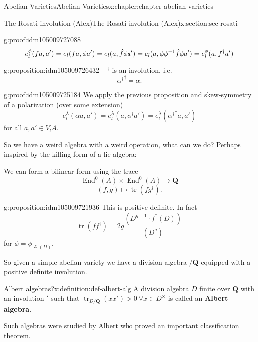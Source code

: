 \documentclass[oneside,10pt,]{book}
\newcommand{\terminology}[1]{\textbf{#1}}
\newcommand{\qedhere}{\relax}
\numberwithin{equation}{section}
\newcommand{\sheaf}[1]{\operatorname{\mathcal{#1}}}
\newcommand{\inv}{^{-1}}
\newcommand{\QQ}{\mathbf{Q}}
\DeclareMathOperator{\End}{End}
\DeclareMathOperator{\tr}{tr}
\begin{document}
\begin{chapterptx}{Abelian Varieties}{}{Abelian Varieties}{}{}{x:chapter:chapter-abelian-varieties}
\begin{sectionptx}{The Rosati involution (Alex)}{}{The Rosati involution (Alex)}{}{}{x:section:sec-rosati}
\begin{proofptx}{}{g:proof:idm105009727088}
%
\begin{equation*}
e_l^\phi(f a ,a')  = e_l(fa, \phi a')= e_l(a, \hat f \phi a') = e_l(a, \phi\phi\inv \hat f \phi a') =  e_l^\phi(a, f^\dagger a')\qedhere
\end{equation*}
%
\end{proofptx}
\begin{proposition}{}{}{g:proposition:idm105009726432}%
\(-^\dagger\) is an involution, i.e.%
\begin{equation*}
{\alpha^\dagger}^{\dagger} = \alpha\text{.}
\end{equation*}
%
\end{proposition}
\begin{proofptx}{}{g:proof:idm105009725184}
We apply the previous proposition and skew-symmetry of a polarization (over some extension)%
\begin{equation*}
e_l^\lambda(\alpha a,a') = e_l^\lambda(a, \alpha^\dagger a') = e_l^\lambda({\alpha^\dagger}^{\dagger} a, a')
\end{equation*}
for all \(a,a'\in V_l A\).%
\end{proofptx}
So we have a weird algebra with a weird operation, what can we do? Perhaps inspired by the killing form of a lie algebra:%
\par
We can form a bilinear form using the trace%
\begin{equation*}
\End^0(A) \times \End^0(A) \to \QQ
\end{equation*}
%
\begin{equation*}
(f,g) \mapsto \tr(fg^\dagger)\text{.}
\end{equation*}
%
\begin{proposition}{}{}{g:proposition:idm105009721936}%
This is positive definite. In fact%
\begin{equation*}
\tr(ff^\dagger) = 2g\frac{(D^{g-1}\cdot f^*(D))}{(D^g)}
\end{equation*}
for \(\phi = \phi_{\sheaf L(D)}\).%
\end{proposition}
So given a simple abelian variety we have a division algebra  \(/ \QQ\) equipped with  a positive definite involution.%
\begin{definition}{Albert algebras?}{x:definition:def-albert-alg}%
A division algebra \(D\) finite over \(\QQ\) with an involution \('\) such that \(\tr_{D/\QQ}(xx') > 0\ \forall x\in D^\times\) is called an \terminology{Albert algebra}.%
\end{definition}
Such algebras were studied by Albert who proved an important classification theorem.%

\end{sectionptx}
\end{chapterptx}
\end{document}

